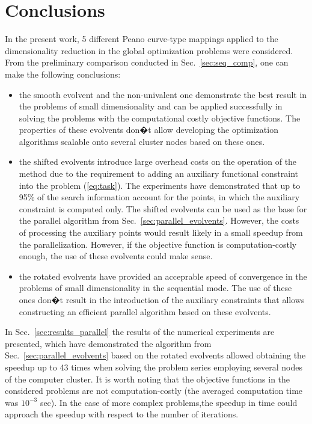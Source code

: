 \documentclass[runningheads]{llncs}
\begin{document}
\section{Conclusions}
In the present work, 5 different Peano curve-type mappings applied to the dimensionality
reduction in the global optimization problems were considered.
From the preliminary comparison conducted in Sec.~\ref{sec:seq_comp}, one can make the
following conclusions:
\begin{itemize}
  \item the smooth evolvent and the non-univalent one demonstrate the best result in the
problems of small dimensionality and can be applied successfully in solving the problems with
the computational costly objective functions. The properties of these evolvents don�t allow
developing the optimization algorithms scalable onto several cluster nodes based on these ones.
  \item the shifted evolvents introduce large overhead costs on the operation of the method due
to the requirement to adding an auxiliary functional constraint into the problem (\ref{eq:task}).
The experiments have demonstrated that up to 95\% of the search information account for the
points, in which the auxiliary constraint is computed only. The shifted evolvents can be used as
the base for the parallel algorithm from Sec.~\ref{sec:parallel_evolvents}. However, the costs of
processing the auxiliary points would result likely in a small speedup from the parallelization.
However, if the objective function is computation-costly enough, the use of these evolvents
could make sense.
  \item the rotated evolvents have provided an acceprable speed of convergence in the problems
of small dimensionality in the sequential mode. The use of these ones don�t result in the
introduction of the auxiliary constraints that allows constructing an efficient parallel algorithm
based on these evolvents.
\end{itemize}

In Sec.~\ref{sec:results_parallel} the results of the numerical experiments are presented, which
have demonstrated the algorithm from Sec.~\ref{sec:parallel_evolvents} based on the rotated
evolvents allowed obtaining the speedup up to 43 times when solving the problem series
employing several nodes of the computer cluster. It is worth noting that the objective functions
in the considered problems are not computation-costly (the averaged computation time was
$10^{-3}$ sec). In the case of more complex problems,the speedup in time could approach the
speedup with respect to the number of iterations.
\end{document}
